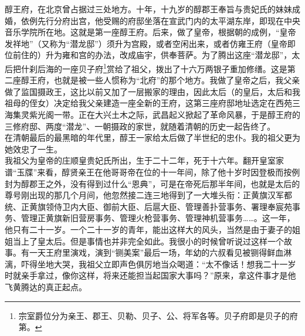 醇王府，在北京曾占据过三处地方。十年，十九岁的醇郡王奉旨与贵妃氏的妹妹成婚，依例先行分府出宫，他受赐的府邸坐落在宣武门内的太平湖东岸，即现在中央音乐学院所在地。这就是第一座醇王府。后来，做了皇帝，根据朝的成例，“皇帝发祥地”（又称为“潜龙邸”）须升为宫殿，或者空闲出来，或者仿雍王府（皇帝即位前住的）升为雍和宫的办法，改成庙宇，供奉菩萨。为了腾出这座“潜龙邸”，太后把什刹后海的一座贝子府\footnote{宗室爵位分为亲王、郡王、贝勒、贝子、公、将军各等。贝子府即是贝子的府第。}赏给了祖父，拨出了十六万两银子重加修缮。这是第二座醇王府，也就是被一些人惯称为“北府”的那个地方。我做了皇帝之后，我父亲做了监国摄政王，这比以前又加了一层搬家的理由，因此太后（的皇后，太后和我祖母的侄女）决定给我父亲建造一座全新的王府，这第三座府邸地址选定在西苑三海集灵紫光阁一带。正在大兴土木之际，武昌起义掀起了革命风暴，于是醇王府的三修府邸、两度“潜龙”、一朝摄政的家世，就随着清朝的历史一起告终了。\\

在清朝最后的最黑暗的年代里，醇王一家给太后做了半世纪的忠仆。我的祖父更为她效忠了一生。\\

我祖父为皇帝的庄顺皇贵妃氏所出，生于二十二年，死于十六年。翻开皇室家谱“玉牒”来看，醇贤亲王在他哥哥帝在位的十一年间，除了他十岁时因登极而按例封为醇郡王之外，没有得到过什么“恩典”，可是在帝死后那半年间，也就是太后的尊号刚出现的那几个月间，他忽然接二连三地得到了一大堆头衔：正黄旗汉军都统、正黄旗领侍卫内大臣、御前大臣、后扈大臣、管理善扑营事务、署理奉宸苑事务、管理正黄旗新旧营房事务、管理火枪营事务、管理神机营事务……。这一年，他只有二十一岁。一个二十一岁的青年，能出这样大的风头，当然是由于妻子的姐姐当上了皇太后。但是事情也并非完全如此。我很小的时候曾听说过这样一个故事。有一天王府里演戏，演到“铡美案”最后一场，年幼的六叔看见被铡得鲜血淋漓，吓得坐地大哭，我祖父立即声色俱厉地当众喝道：“太不像话！想我二十一岁时就亲手拿过，像你这样，将来还能担当起国家大事吗？”原来，拿这件事才是他飞黄腾达的真正起点。\\

